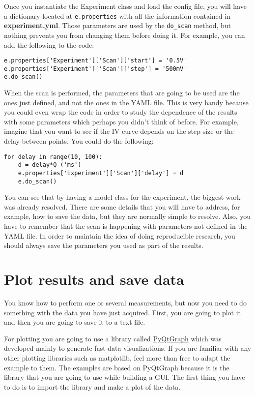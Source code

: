Once you instantiate the Experiment class and load the config file, you
will have a dictionary located at \texttt{e.properties} with all the
information contained in \textbf{experiment.yml}. Those parameters are
used by the \texttt{do_scan} method, but nothing prevents you from
changing them before doing it. For example, you can add the following to
the code:

\begin{verbatim}
e.properties['Experiment']['Scan']['start'] = '0.5V'
e.properties['Experiment']['Scan']['step'] = '500mV'
e.do_scan()
\end{verbatim}

When the scan is performed, the parameters that are going to be used are
the ones just defined, and not the ones in the {YAML} file. This is very
handy because you could even wrap the code in order to study the
dependence of the results with some parameters which perhaps you didn't
think of before. For example, imagine that you want to see if the {IV}
curve depends on the step size or the delay between points. You could do
the following:

\begin{verbatim}
for delay in range(10, 100):
    d = delay*Q_('ms')
    e.properties['Experiment']['Scan']['delay'] = d
    e.do_scan()
\end{verbatim}

You can see that by having a model class for the experiment, the biggest
work was already resolved. There are some details that you will have to
address, for example, how to save the data, but they are normally simple
to resolve. Also, you have to remember that the scan is happening with
parameters not defined in the {YAML} file. In order to maintain the idea
of doing reproducible research, you should always save the parameters
you used as part of the results.

\section{Plot results and save data}\label{plot-results-and-savedata}
You know how to perform one or several measurements, but now you need to
do something with the data you have just acquired. First, you are going
to plot it and then you are going to save it to a text file.

For plotting you are going to use a library called
\href{http://www.pyqtgraph.org/}{PyQtGraph} which was developed mainly
to generate fast data visualizations. If you are familiar with any other
plotting libraries such as matplotlib, feel more than free to adapt the
example to them. The examples are based on PyQtGraph because it is the
library that you are going to use while building a {GUI}. The first
thing you have to do is to import the library and make a plot of
the data.

